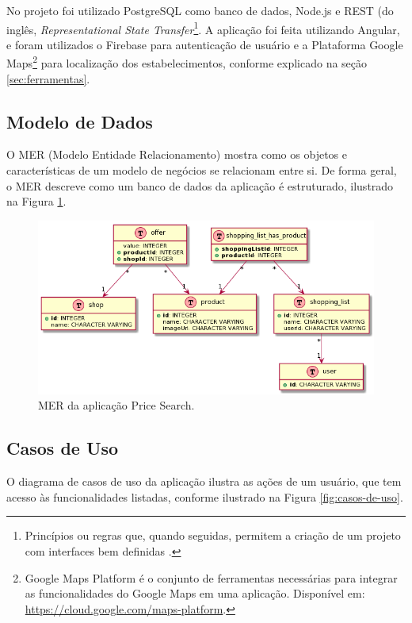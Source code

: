  No projeto foi utilizado PostgreSQL como banco de dados, Node.js e REST (do inglês, \textit{Representational State Transfer}\footnote{Princípios ou regras que, quando seguidas, permitem a criação de um projeto com interfaces bem definidas \cite{pires2017rest}.}. A aplicação foi feita utilizando Angular, e foram utilizados o Firebase para autenticação de usuário e a Plataforma Google Maps\footnote{Google Maps Platform é o conjunto de ferramentas necessárias para integrar as funcionalidades do Google Maps em uma aplicação. Disponível em: \url{https://cloud.google.com/maps-platform}.} para localização dos estabelecimentos, conforme explicado na seção \ref{sec:ferramentas}.
 
\subsection{Modelo de Dados}
 
 O MER (Modelo Entidade Relacionamento) mostra como os objetos e características de um modelo de negócios se relacionam entre si. De forma geral, o MER descreve como um banco de dados da aplicação é estruturado, ilustrado na Figura \ref{fig:mer}.
 
 
\begin{figure}[!htb]
\centering
\includegraphics[width=\linewidth]{figuras/MER.png}
\caption{MER da aplicação Price Search.}
\label{fig:mer}
\end{figure}
 
  
 \subsection{Casos de Uso}
O diagrama de casos de uso da aplicação ilustra as ações de um usuário, que tem acesso às funcionalidades listadas, conforme ilustrado na Figura \ref{fig:casos-de-uso}.

